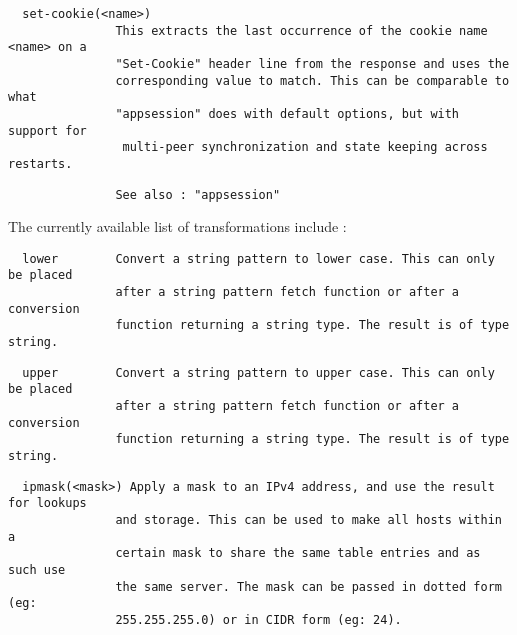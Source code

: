 \begin{verbatim}
  set-cookie(<name>)
               This extracts the last occurrence of the cookie name <name> on a
               "Set-Cookie" header line from the response and uses the
               corresponding value to match. This can be comparable to what
               "appsession" does with default options, but with support for
                multi-peer synchronization and state keeping across restarts.
\end{verbatim}

\begin{verbatim}
               See also : "appsession"
\end{verbatim}


The currently available list of transformations include :

\begin{verbatim}
  lower        Convert a string pattern to lower case. This can only be placed
               after a string pattern fetch function or after a conversion
               function returning a string type. The result is of type string.
\end{verbatim}

\begin{verbatim}
  upper        Convert a string pattern to upper case. This can only be placed
               after a string pattern fetch function or after a conversion
               function returning a string type. The result is of type string.
\end{verbatim}

\begin{verbatim}
  ipmask(<mask>) Apply a mask to an IPv4 address, and use the result for lookups
               and storage. This can be used to make all hosts within a
               certain mask to share the same table entries and as such use
               the same server. The mask can be passed in dotted form (eg:
               255.255.255.0) or in CIDR form (eg: 24).
\end{verbatim}

